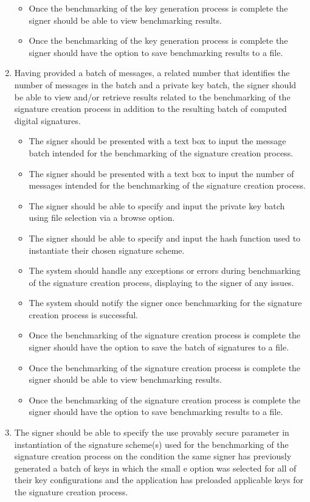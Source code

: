 \documentclass[]{final_report}
\theoremstyle{definition}
\begin{document}
\begin{enumerate}
\begin{itemize}
\item Once the benchmarking of the key generation process is complete the signer should be able to view benchmarking results.
\item Once the benchmarking of the key generation process is complete the signer should have the option to save benchmarking results to a file.
\end{itemize}
\item Having provided a batch of messages, a related number that identifies the number of messages in the batch and a private key batch, the signer should be able to view and/or retrieve results related to the benchmarking of the signature creation process in addition to the resulting batch of computed digital signatures.
\begin{itemize}
\item The signer should be presented with a text box to input the message batch intended for the benchmarking of the signature creation process.
\item The signer should be presented with a text box to input the number of messages intended for the benchmarking of the signature creation process.
\item The signer should be able to specify and input the private key batch using file selection via a browse option.
\item The signer should be able to specify and input the hash function used to instantiate their chosen signature scheme.
\item The system should handle any exceptions or errors during benchmarking of the signature creation process, displaying to the signer of any issues.
\item The system should notify the signer once benchmarking for the signature creation process is successful.
\item Once the benchmarking of the signature creation process is complete the signer should have the option to save the batch of signatures to a file.
\item Once the benchmarking of the signature creation process is complete the signer should be able to view benchmarking results.
\item Once the benchmarking of the signature creation process is complete the signer should have the option to save benchmarking results to a file.
\end{itemize}
\item The signer should be able to specify the use provably secure parameter in instantiation of the signature scheme(s) used for the benchmarking of the signature creation process on the condition the same signer has previously generated a batch of keys in which the small e option was selected for all of their key configurations and the application has preloaded applicable keys for the signature creation process.

\end{enumerate}
\end{document}
